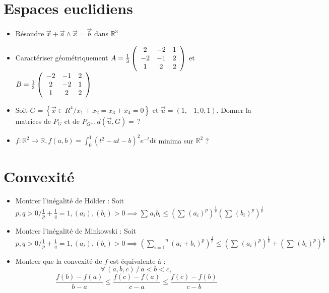 \documentclass[a4paper, 11pt, french]{article}
\newcommand{\R}{\mathbb{R}}
\newcommand{\p}{\wedge}
\newcommand{\dt}{\mathrm{d}t}
\newcommand{\som}[2]{\overset{#2}{\underset{#1}{\sum}}}
\newcommand{\inv}[1]{\frac{1}{#1}}
\newcommand{\acc}[1]{\left\{ #1 \right\}}
\newcommand{\coeff}[2]{\dfrac{f\left(#1\right) - f\left(#2\right)}{#1-#2}}
\begin{document}
	\section*{Espaces euclidiens}
	\begin{itemize}
 		\item Résoudre $\vec{x}+\vec{a}\p \vec{x}=\vec{b}$ dans $\R^3$
		\item Caractériser géométriquement $A=\inv{3} \left( \begin{array}{c c c} 2 & -2 & 1 \\ -2 & -1 & 2 \\ 1 & 2 & 2 \end{array} \right)$ et $B=\inv{3} \left( \begin{array}{c c c} -2 & -1 & 2 \\ 2 & -2 & 1 \\ 1 & 2 & 2 \end{array} \right)$
		\item Soit $G=\acc{\vec{x} \in R^4 / x_1+x_2=x_3+x_4=0}$ et $\vec{u}=(1,-1,0,1).$ Donner la matrices de $P_G$ et de $P_{G^{\perp}}.  \, d(\vec{u},G) = \, ?$
		\item $f : \R^2 \rightarrow \R, f(a,b)=\int_0^1(t^2-at-b)^2e^{-t}\dt$ minima sur $\R^2$ ?
	\end{itemize}

	\section*{Convexité}
	\begin{itemize}
		\item Montrer l'inégalité de Hölder : Soit $p,q>0 / \inv{p}+\inv{q}=1, (a_i),(b_i)>0 \implies {\som{}{}a_ib_i \leqslant (\som{}{}(a_i)^p)^{\inv{p}}(\som{}{}(b_i)^p)^{\inv{p}}}$
		\item Montrer l'inégalité de Minkowski : Soit $p,q>0 / \inv{p}+\inv{q}=1, (a_i),(b_i)>0 \implies {(\som{i=1}{n}(a_i+b_i)^p)^{\inv{p}}\leqslant (\som{}{}(a_i)^p)^{\inv{p}} + (\som{}{}(b_i)^p)^{\inv{p}}}$
 		\item Montrer que la convexité de $f$ est équivalente à :
	\[\forall\,(a,b,c)\, /\, a<b<c,\]
	\begin{equation}
		\coeff{b}{a} \leqslant \coeff{c}{a} \leqslant \coeff{c}{b}
		\label{ineq}
	\end{equation}
	\end{itemize}
\end{document}
